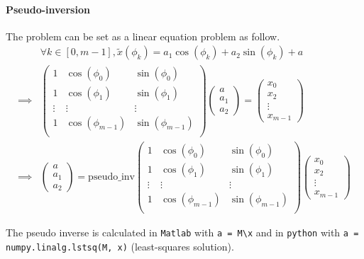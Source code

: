 \paragraph{Pseudo-inversion}
The problem can be set as a linear equation problem as follow.
\begin{align}
&\forall k \in [0,m-1], \tilde{x}(\phi_k) = a_1 \cos(\phi_k) + a_2 \sin(\phi_k) + a \nonumber \\
%
\implies &
\begin{pmatrix}
1 & \cos(\phi_0) & \sin(\phi_0) \\
1 & \cos(\phi_1) & \sin(\phi_1) \\
\vdots & \vdots & \vdots \\
1 & \cos(\phi_{m-1}) & \sin(\phi_{m-1}) \\
\end{pmatrix}
\begin{pmatrix}
a \\ a_1 \\ a_2
\end{pmatrix}
=
\begin{pmatrix}
x_0 \\ x_2 \\ \vdots \\ x_{m-1}
\end{pmatrix} \nonumber
\\
%
\implies &
\begin{pmatrix}
a \\ a_1 \\ a_2
\end{pmatrix}
= 
\mathrm{pseudo\_inv}
\begin{pmatrix}
1 & \cos(\phi_0) & \sin(\phi_0) \\
1 & \cos(\phi_1) & \sin(\phi_1) \\
\vdots & \vdots & \vdots \\
1 & \cos(\phi_{m-1}) & \sin(\phi_{m-1}) \\
\end{pmatrix}
\begin{pmatrix}
x_0 \\ x_2 \\ \vdots \\ x_{m-1}
\end{pmatrix}
\end{align}

The pseudo inverse is calculated in \texttt{Matlab} with \verb$a = M\x$ and in \texttt{python} with \verb$a = numpy.linalg.lstsq(M, x)$ (least-squares solution).

